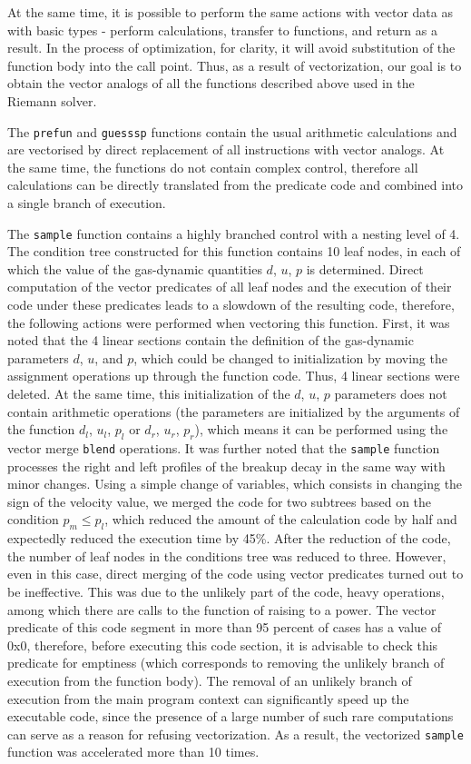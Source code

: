 \documentclass[
11pt,%
tightenlines,%
twoside,%
onecolumn,%
nofloats,%
nobibnotes,%
nofootinbib,%
superscriptaddress,%
noshowpacs,%
centertags]%
{revtex4}
\begin{document}
At the same time, it is possible to perform the same actions with vector data as with basic types - perform calculations, transfer to functions, and return as a result.
In the process of optimization, for clarity, it will avoid substitution of the function body into the call point. Thus, as a result of vectorization, our goal is to obtain the vector analogs of all the functions described above used in the Riemann solver.

The \texttt{prefun} and \texttt{guesssp} functions contain the usual arithmetic calculations and are vectorised by direct replacement of all instructions with vector analogs.
At the same time, the functions do not contain complex control, therefore all calculations can be directly translated from the predicate code and combined into a single branch of execution.

The \texttt{sample} function contains a highly branched control with a nesting level of 4.
The condition tree constructed for this function contains 10 leaf nodes, in each of which the value of the gas-dynamic quantities $d$, $u$, $p$ is determined.
Direct computation of the vector predicates of all leaf nodes and the execution of their code under these predicates leads to a slowdown of the resulting code, therefore, the following actions were performed when vectoring this function.
First, it was noted that the 4 linear sections contain the definition of the gas-dynamic parameters $d$, $u$, and $p$, which could be changed to initialization by moving the assignment operations up through the function code.
Thus, 4 linear sections were deleted.
At the same time, this initialization of the $d$, $u$, $p$ parameters does not contain arithmetic operations (the parameters are initialized by the arguments of the function $d_l$, $u_l$, $p_l$ or $d_r$, $u_r$, $p_r$), which means it can be performed using the vector merge \texttt{blend} operations.
It was further noted that the \texttt{sample} function processes the right and left profiles of the breakup decay in the same way with minor changes.
Using a simple change of variables, which consists in changing the sign of the velocity value, we merged the code for two subtrees based on the condition $p_m \le p_l$, which reduced the amount of the calculation code by half and expectedly reduced the execution time by 45\%.
After the reduction of the code, the number of leaf nodes in the conditions tree was reduced to three.
However, even in this case, direct merging of the code using vector predicates turned out to be ineffective.
This was due to the unlikely part of the code, heavy operations, among which there are calls to the function of raising to a power.
The vector predicate of this code segment in more than 95 percent of cases has a value of 0x0, therefore, before executing this code section, it is advisable to check this predicate for emptiness (which corresponds to removing the unlikely branch of execution from the function body).
The removal of an unlikely branch of execution from the main program context can significantly speed up the executable code, since the presence of a large number of such rare computations can serve as a reason for refusing vectorization.
As a result, the vectorized \texttt{sample} function was accelerated more than 10 times.
\end{document}

